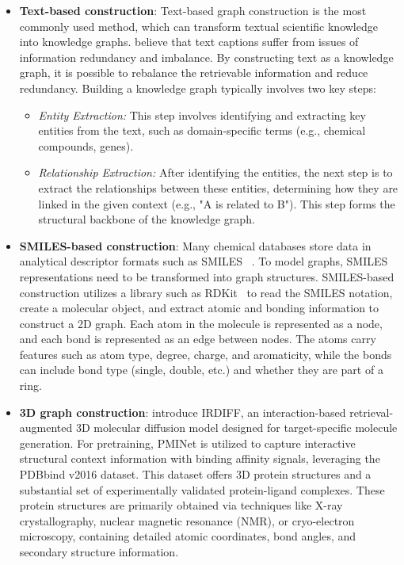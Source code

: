 \begin{itemize}[leftmargin=*]
\item \textbf{Text-based construction}: Text-based graph construction is the most commonly used method, which can transform textual scientific knowledge into knowledge graphs. \citet{delile2024graph} believe that text captions suffer from issues of information redundancy and imbalance. By constructing text as a knowledge graph, it is possible to rebalance the retrievable information and reduce redundancy.
Building a knowledge graph typically involves two key steps:

\begin{itemize}[leftmargin=*]
    \item {\it Entity Extraction:} This step involves identifying and extracting key entities from the text, such as domain-specific terms (e.g., chemical compounds, genes).

    \item {\it Relationship Extraction:} After identifying the entities, the next step is to extract the relationships between these entities, determining how they are linked in the given context (e.g., "A is related to B"). This step forms the structural backbone of the knowledge graph.
\end{itemize}

\item \textbf{SMILES-based construction}:
Many chemical databases store data in analytical descriptor formats such as SMILES  ~\cite{wang2022retrieval}. To model graphs, SMILES representations need to be transformed into graph structures.
SMILES-based construction utilizes a library such as RDKit~\cite{landrum2013rdkit} to read the SMILES notation, create a molecular object, and extract atomic and bonding information to construct a 2D graph. Each atom in the molecule is represented as a node, and each bond is represented as an edge between nodes. The atoms carry features such as atom type, degree, charge, and aromaticity, while the bonds can include bond type (single, double, etc.) and whether they are part of a ring.

\item \textbf{3D graph construction}:
\citet{huanginteraction} introduce IRDIFF, an interaction-based retrieval-augmented 3D molecular diffusion model designed for target-specific molecule generation. For pretraining, PMINet is utilized to capture interactive structural context information with binding affinity signals, leveraging the PDBbind v2016 dataset. This dataset offers 3D protein structures and a substantial set of experimentally validated protein-ligand complexes. These protein structures are primarily obtained via techniques like X-ray crystallography, nuclear magnetic resonance (NMR), or cryo-electron microscopy, containing detailed atomic coordinates, bond angles, and secondary structure information.
\end{itemize}

